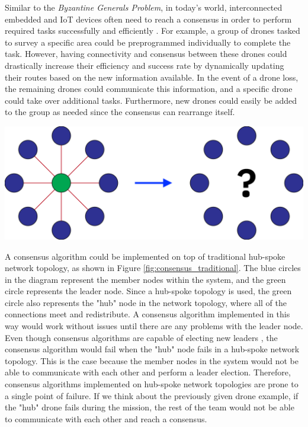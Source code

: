 Similar to the \textit{Byzantine Generals Problem}, in today's world, interconnected embedded and IoT devices often need to reach a consensus in order to perform required tasks successfully and efficiently \cite{Orostica_Nunez_2019}. For example, a group of drones tasked to survey a specific area could be preprogrammed individually to complete the task. However, having connectivity and consensus between these drones could drastically increase their efficiency and success rate by dynamically updating their routes based on the new information available. In the event of a drone loss, the remaining drones could communicate this information, and a specific drone could take over additional tasks. Furthermore, new drones could easily be added to the group as needed since the consensus can rearrange itself. 


\begingroup
    \centering
    \medskip
    \includegraphics[width=0.5\columnwidth]{final-proposal/images/consensus_traditional.png}
    \label{fig:consensus_traditional}
\endgroup

A consensus algorithm could be implemented on top of traditional hub-spoke network topology, as shown in Figure \ref{fig:consensus_traditional}. The blue circles in the diagram represent the member nodes within the system, and the green circle represents the leader node. Since a hub-spoke topology is used, the green circle also represents the "hub" node in the network topology, where all of the connections meet and redistribute. A consensus algorithm implemented in this way would work without issues until there are any problems with the leader node. Even though consensus algorithms are capable of electing new leaders \cite{raft_paper}, the consensus algorithm would fail when the "hub" node fails in a hub-spoke network topology. This is the case because the member nodes in the system would not be able to communicate with each other and perform a leader election. Therefore, consensus algorithms implemented on hub-spoke network topologies are prone to a single point of failure. If we think about the previously given drone example, if the "hub" drone fails during the mission, the rest of the team would not be able to communicate with each other and reach a consensus.

